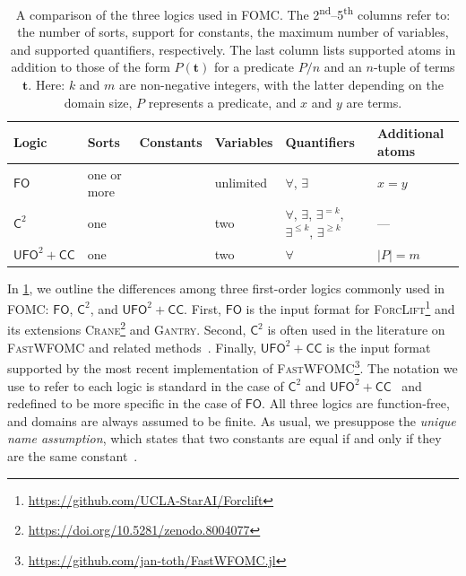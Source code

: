 \documentclass[a4paper,UKenglish,cleveref, autoref, thm-restate]{lipics-v2021}
\newcommand{\cmark}{\ding{51}}
\newcommand{\xmark}{\ding{55}}
\newcommand{\Ctwo}{$\mathsf{C}^{2}$}
\newcommand{\FO}{$\mathsf{FO}$}
\newcommand{\UFO}{$\mathsf{UFO}^{2} + \mathsf{CC}$}
\newcommand{\Cranetwo}{\textsc{Gantry}}
\begin{document}

\begin{table}[t]
  \centering
  \begin{tabular}{llclll}
    \toprule
    Logic & Sorts & Constants & Variables & Quantifiers & Additional atoms\\
    \midrule
    \FO & one or more & \cmark & unlimited & $\forall$, $\exists$ & $x = y$\\
    \Ctwo & one & \xmark & two & $\forall$, $\exists$, $\exists^{= k}$, $\exists^{\le k}$, $\exists^{\ge k}$ & ---\\
    \UFO & one & \xmark & two & $\forall$ & $|P| = m$\\
    \bottomrule
  \end{tabular}
  \caption{A comparison of the three logics used in FOMC\@. The
    2\textsuperscript{nd}--5\textsuperscript{th} columns refer to: the number of
    sorts, support for constants, the maximum number of variables, and supported
    quantifiers, respectively. The last column lists supported atoms in addition
    to those of the form $P(\mathbf{t})$ for a predicate $P/n$ and an $n$-tuple
    of terms $\mathbf{t}$. Here: $k$ and $m$ are non-negative integers, with the
    latter depending on the domain size, $P$ represents a predicate, and $x$ and
    $y$ are terms. }\label{tbl:logics}
\end{table}

\renewcommand*{\thefootnote}{\fnsymbol{footnote}}

In \cref{tbl:logics}, we outline the differences among three first-order logics
commonly used in FOMC: \FO{}, \Ctwo{}, and \UFO{}. First, \FO{} is the input
format for
\textsc{ForcLift}\footnote{\url{https://github.com/UCLA-StarAI/Forclift}} and
its extensions
\textsc{Crane}\footnote{\url{https://doi.org/10.5281/zenodo.8004077}} and
\Cranetwo{}. Second, \Ctwo{} is often used in the literature on
\textsc{FastWFOMC} and related
methods~\cite{DBLP:journals/jair/Kuzelka21,DBLP:conf/aaai/MalhotraS22}. Finally,
\UFO{} is the input format supported by the most recent implementation of
\textsc{FastWFOMC}\footnote{\url{https://github.com/jan-toth/FastWFOMC.jl}}. The
notation we use to refer to each logic is standard in the case of \Ctwo{} and
\UFO{}~\cite{tóth2024complexityweightedfirstordermodel} and redefined to be more
specific in the case of \FO{}. All three logics are function-free, and domains
are always assumed to be finite. As usual, we presuppose the \emph{unique name
  assumption}, which states that two constants are equal if and only if they are
the same constant~\cite{DBLP:books/aw/RN2020}.
\end{document}
